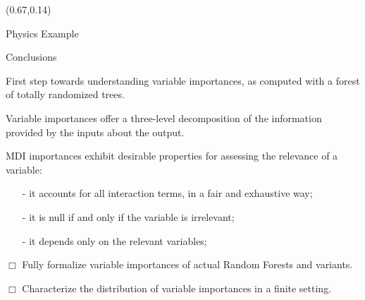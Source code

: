\documentclass[final]{beamer}
\newcommand{\cmark}{\ding{51}}%
\begin{document}
\begin{frame}{}

\begin{textblock}{0.32}(0.67,0.14)

\begin{block}{Physics Example \phantom{p}}

\end{block}

\vspace{0.5cm}
\begin{block}{Conclusions \phantom{p}}

{\color{green} \cmark} First step towards understanding variable importances, as computed with a forest of totally randomized trees.

{\color{green} \cmark} Variable importances offer a three-level decomposition of the information provided by the inputs about the output.

{\color{green} \cmark} MDI importances exhibit desirable properties for assessing the relevance of a variable:
\begin{itemize}
\item[-] it accounts for all interaction terms, in a fair and exhaustive way;
\item[-] it is null if and only if the variable is irrelevant;
\item[-] it depends only on the relevant variables;
\end{itemize}

{\color{blue} $\Box$} Fully formalize variable importances of actual Random Forests and variants.

{\color{blue} $\Box$} Characterize the distribution of variable importances in a finite setting.


\end{block}

\end{textblock}




\end{frame}
\end{document}
